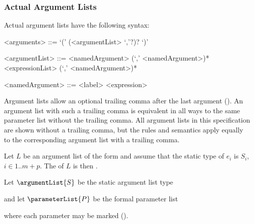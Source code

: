 \documentclass[makeidx]{article}
\begin{document}



\subsubsection{Actual Argument Lists}

\LMHash{}%
Actual argument lists have the following syntax:

\begin{grammar}
<arguments> ::= `(' (<argumentList> `,'?)? `)'

<argumentList> ::= <namedArgument> (`,' <namedArgument>)*
  \alt <expressionList> (`,' <namedArgument>)*

<namedArgument> ::= <label> <expression>
\end{grammar}

\LMHash{}%
Argument lists allow an optional trailing comma after the last argument ().
An argument list with such a trailing comma is equivalent in all ways to the same parameter list without the trailing comma.
All argument lists in this specification are shown without a trailing comma,
but the rules and semantics apply equally to the corresponding argument list with a trailing comma.

\LMHash{}%
Let $L$ be an argument list of the form
and assume that the static type of $e_i$ is $S_i$, $i \in 1 .. m+p$.
The  of $L$ is then
.

\LMHash{}%
Let $\argumentList{S}$ be the static argument list type


\noindent
and let $\parameterList{P}$ be the formal parameter list


\noindent
where each parameter may be marked \COVARIANT{} ().
\end{document}
